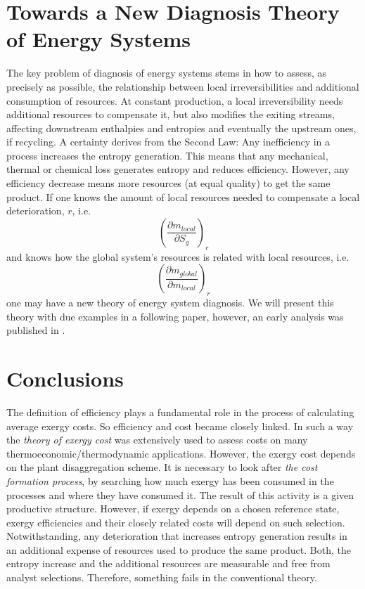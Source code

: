 \documentclass[energies,article,submit,moreauthors,pdftex]{Definitions/mdpi}
\begin{document}
\section{Towards a New Diagnosis Theory of Energy Systems}
The key problem of diagnosis of energy systems stems in how to assess, as precisely as possible, the relationship between local irreversibilities and additional consumption of resources. At constant production, a local irreversibility needs additional resources to compensate it, but also modifies the exiting streams, affecting downstream enthalpies and entropies and eventually the upstream ones, if recycling. 
A certainty derives from the Second Law: Any inefficiency in a process increases the entropy generation. This means that any mechanical, thermal or chemical loss generates entropy and reduces efficiency. However, any efficiency decrease means more resources (at equal quality) to get the same product. 
If one knows the amount of local resources needed to compensate a local deterioration, $r$, i.e.
\[
\left(\frac{\partial m_{local}}{\partial S_g}\right)_r
\] 
and knows how the global system's resources is related with local resources, i.e.
\[
\left(\frac{\partial m_{global}}{\partial m_{local}}\right)_r
\]
one may have a new theory of energy system diagnosis. We will present this theory with due examples in a following paper, however, an early analysis was published in \cite{Royo1997}.

\section{Conclusions}
The definition of efficiency plays a fundamental role in the process of calculating average exergy costs. So efficiency and cost became closely linked. In such a way the \emph{theory of exergy cost} \cite{Valero1986a,Lozano1993} was extensively used to assess costs on many thermoeconomic/thermodynamic applications. However, the exergy cost depends on the plant disaggregation scheme. It is necessary to look after \emph{the cost formation process}, by searching how much exergy has been consumed in the processes and where they have consumed it. The result of this activity is a given productive structure. However, if exergy depends on a chosen reference state, exergy efficiencies and their closely related costs will depend on such selection. Notwithstanding, any deterioration that increases entropy generation results in an additional expense of resources used to produce the same product. Both, the entropy increase and the additional resources are measurable and free from analyst selections. Therefore, something fails in the conventional theory. 
\end{document}

